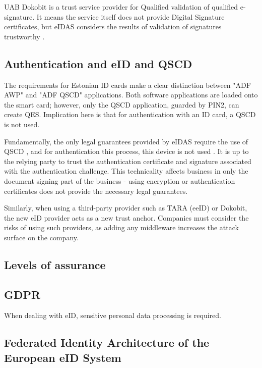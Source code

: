 UAB Dokobit is a trust service provider for Qualified validation of qualified e-signature. It means the service itself does not provide Digital Signature certificates, but eIDAS considers the results of validation of signatures trustworthy \cite{eu-trustservices}.

\subsection{Authentication and eID and QSCD}


The requirements for Estonian ID cards make a clear distinction between "ADF AWP" and "ADF QSCD" applications. Both software applications are loaded onto the smart card; however, only the QSCD application, guarded by PIN2, can create QES. Implication here is that for authentication with an ID card, a QSCD is not used.

Fundamentally, the only legal guarantees provided by eIDAS require the use of QSCD \cite{eulaw-eidas}, and for authentication this process, this device is not used \cite{ee-id-tech}. It is up to the relying party to trust the authentication certificate and signature associated with the authentication challenge. This technicality affects business in only the document signing part of the business - using encryption or authentication certificates does not provide the necessary legal guarantees.

Similarly, when using a third-party provider such as TARA (eeID) or Dokobit, the new eID provider acts as a new trust anchor. Companies must consider the risks of using such providers, as adding any middleware increases the attack surface on the company.

\subsection{Levels of assurance}


\subsection{GDPR}

When dealing with eID, sensitive personal data processing is required. 

\subsection{Federated Identity Architecture of the European eID System}

